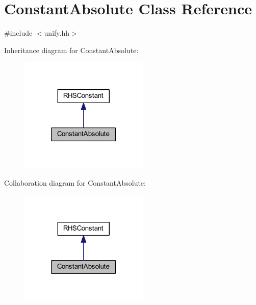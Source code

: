 \hypertarget{class_constant_absolute}{}\section{Constant\+Absolute Class Reference}
\label{class_constant_absolute}


{\ttfamily \#include $<$unify.\+hh$>$}



Inheritance diagram for Constant\+Absolute\+:
\nopagebreak
\begin{figure}[H]
\begin{center}
\leavevmode
\includegraphics[width=174pt]{class_constant_absolute__inherit__graph}
\end{center}
\end{figure}


Collaboration diagram for Constant\+Absolute\+:
\nopagebreak
\begin{figure}[H]
\begin{center}
\leavevmode
\includegraphics[width=174pt]{class_constant_absolute__coll__graph}
\end{center}
\end{figure}
